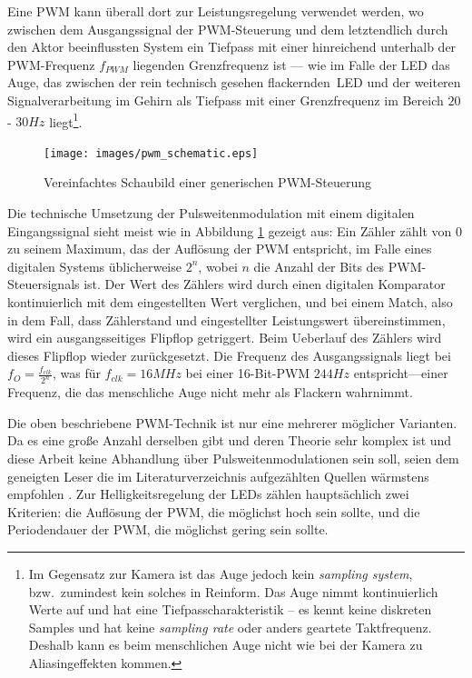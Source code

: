 \documentclass[12pt,a4paper,notitlepage]{article}
\begin{document}
Eine \gls{PWM} kann überall dort zur Leistungsregelung verwendet werden, wo zwischen dem Ausgangssignal der \gls{PWM}-Steuerung und dem letztendlich durch den Aktor beeinflussten System ein Tiefpass mit einer hinreichend unterhalb der PWM-Frequenz $f_{PWM}$ liegenden Grenzfrequenz ist --- wie im Falle der \gls{LED} das Auge, das zwischen der rein technisch gesehen \glqq flackernden\grqq\ \gls{LED} und der weiteren Signalverarbeitung im Gehirn als Tiefpass mit einer Grenzfrequenz im Bereich $20$ - $30Hz$ liegt\footnote{Im Gegensatz zur Kamera ist das Auge jedoch kein \emph{sampling system}, bzw.\ zumindest kein solches in Reinform. Das Auge nimmt kontinuierlich Werte auf und hat eine Tiefpasscharakteristik -- es kennt keine diskreten Samples und hat keine \emph{sampling rate} oder anders geartete Taktfrequenz. Deshalb kann es beim menschlichen Auge nicht wie bei der Kamera zu Aliasingeffekten kommen.}.

\begin{figure}
\centering
\texttt{[image: images/pwm\_schematic.eps]}
\caption{Vereinfachtes Schaubild einer generischen PWM-Steuerung}
\label{pwm_schematic}
\end{figure}

Die technische Umsetzung der Pulsweitenmodulation mit einem digitalen Eingangssignal sieht meist wie in Abbildung \ref{pwm_schematic}
gezeigt aus: Ein Zähler zählt von 0 zu seinem Maximum, das der Auflösung der \gls{PWM} entspricht, im Falle eines digitalen Systems üblicherweise $2^n$, wobei $n$ die Anzahl der Bits des \gls{PWM}-Steuersignals ist. Der Wert des Zählers wird durch einen digitalen Komparator kontinuierlich mit dem eingestellten Wert verglichen, und bei einem \glqq Match\grqq, also in dem Fall, dass Zählerstand und eingestellter Leistungswert übereinstimmen, wird ein ausgangsseitiges \gls{Flipflop} getriggert. Beim \gls{Ueberlauf} des Zählers wird dieses Flipflop wieder zurückgesetzt. Die Frequenz des Ausgangssignals liegt bei $f_O=\frac{f_{clk}}{2^n}$, was für $f_{clk}=16MHz$ bei einer 16-Bit-PWM $244Hz$ entspricht---einer Frequenz, die das menschliche Auge nicht mehr als Flackern wahrnimmt.

Die oben beschriebene \gls{PWM}-Technik ist nur eine mehrerer möglicher Varianten. Da es eine große Anzahl derselben gibt und deren Theorie sehr komplex ist und diese Arbeit keine Abhandlung über Pulsweitenmodulationen sein soll, seien dem geneigten Leser die im Literaturverzeichnis aufgezählten Quellen wärmstens empfohlen \cite{ATMEL1, ATMEL2, ATMEL3}. Zur Helligkeitsregelung der LEDs zählen hauptsächlich zwei Kriterien: die Auflösung der PWM, die möglichst hoch sein sollte, und die Periodendauer der PWM, die möglichst gering sein sollte.
\end{document}
